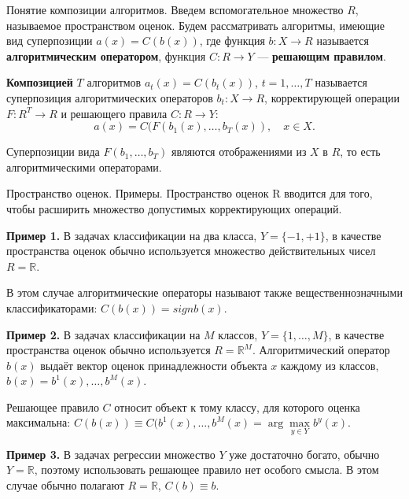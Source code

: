 \documentclass[10pt,unicode,notheorems]{beamer}
\begin{document}
\begin{frame}{Понятие композиции алгоритмов.}
Введем вспомогательное множество $R$, называемое пространством оценок. Будем рассматривать алгоритмы, имеющие вид суперпозиции $a(x) = C(b(x))$, где функция $b : X \to R$ называется \textbf {алгоритмическим оператором}, функция $C : R \to Y$ — \textbf{решающим правилом}.
\vspace{0.2cm}

\textbf{Композицией} $T$ алгоритмов $a_t(x) = C(b_t(x))$, $t = 1, \ldots, T$ называется суперпозиция алгоритмических операторов $b_t: X \to R$, корректирующей операции $F : R^T \to R$ и решающего правила $C : R \to Y$:
\begin{equation}
a(x) = C(F(b_1(x), \ldots , b_T (x)), \quad x \in X.
\end{equation}

Суперпозиции вида $F(b_1, \ldots , b_T)$ являются отображениями из $X$ в $R$, то есть алгоритмическими операторами.
\end{frame}


\begin{frame}{Пространство оценок. Примеры.}
Пространство оценок R вводится для того, чтобы расширить множество допустимых корректирующих операций.
\vspace{0.2cm}

\textbf{Пример 1.} В задачах классификации на два класса, $Y = \{-1, +1\}$, в качестве пространства оценок обычно используется множество действительных чисел $R = \mathbb{R}$.

В этом случае алгоритмические операторы называют также вещественнозначными
классификаторами: $C(b(x)) = sign b(x)$.
\vspace{0.2cm}

\textbf{Пример 2.} В задачах классификации на $M$ классов, $Y = \{1, \ldots , M\}$, в качестве пространства оценок обычно используется $R = \mathbb {R}^M$. Алгоритмический оператор $b(x)$ выдаёт вектор оценок принадлежности объекта $x$ каждому из классов, $b(x) = b^1(x), \ldots, b^M(x)$. 

Решающее правило $C$ относит объект к тому классу, для которого оценка максимальна:
$C(b(x)) \equiv C(b^1(x), \ldots, b^M(x)= \arg \max \limits_{y \in Y} b^y(x)$.
\vspace{0.2cm}

\textbf{Пример 3.} В задачах регрессии множество $Y$ уже достаточно богато, обычно $Y = \mathbb R$, поэтому использовать решающее правило нет особого смысла. В этом случае обычно полагают $R = \mathbb R$, $C(b) \equiv b$.
\end{frame}
\end{document}
